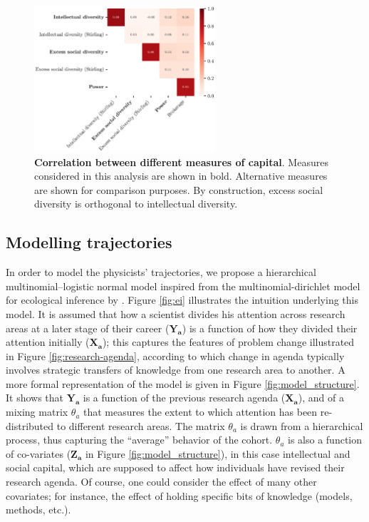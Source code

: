 \documentclass{article}
\begin{document}
\begin{figure}[h]
    \centering
    \includegraphics[width=0.6\textwidth]{plots/capital_measures.eps}
    \caption{\textbf{Correlation between different measures of capital}. Measures considered in this analysis are shown in bold. Alternative measures are shown for comparison purposes. By construction, excess social diversity is orthogonal to intellectual diversity. }
    \label{fig:capital_measures}
\end{figure}

\subsection{\label{sec:model}Modelling trajectories}

In order to model the physicists' trajectories, we propose a hierarchical multinomial--logistic normal model inspired from the multinomial-dirichlet model for ecological inference by \citet{RosJiaKin01}. Figure \ref{fig:ei} illustrates the intuition underlying this model. It is assumed that how a scientist divides his attention across research areas at a later stage of their career ($\bm{Y_{a}}$) is a function of how they divided their attention initially ($\bm{X_{a}}$); this captures the features of problem change illustrated in Figure \ref{fig:research-agenda}, according to which change in agenda typically involves strategic transfers of knowledge from one research area to another. A more formal representation of the model is given in Figure \ref{fig:model_structure}. It shows that $\bm{Y_{a}}$ is a function of the previous research agenda ($\bm{X_{a}}$), and of a mixing matrix $\theta_a$ that measures the extent to which attention has been re-distributed to different research areas. The matrix $\theta_a$ is drawn from a hierarchical process, thus capturing the ``average'' behavior of the cohort. $\theta_a$ is also a function of co-variates ($\bm{Z_a}$ in Figure \ref{fig:model_structure}), in this case intellectual and social capital, which are supposed to affect how individuals have revised their research agenda. Of course, one could consider the effect of many other covariates; for instance, the effect of holding specific bits of knowledge (models, methods, etc.).
\end{document}
